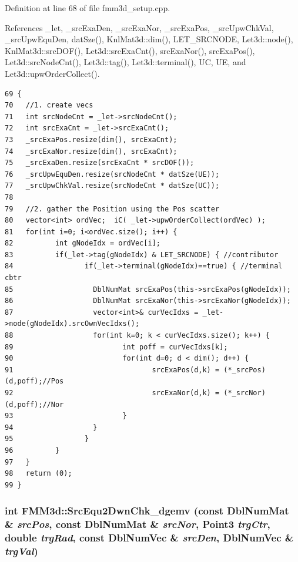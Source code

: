 Definition at line 68 of file fmm3d\_\-setup.cpp.

References \_\-let, \_\-src\-Exa\-Den, \_\-src\-Exa\-Nor, \_\-src\-Exa\-Pos, \_\-src\-Upw\-Chk\-Val, \_\-src\-Upw\-Equ\-Den, dat\-Sze(), Knl\-Mat3d::dim(), LET\_\-SRCNODE, Let3d::node(), Knl\-Mat3d::src\-DOF(), Let3d::src\-Exa\-Cnt(), src\-Exa\-Nor(), src\-Exa\-Pos(), Let3d::src\-Node\-Cnt(), Let3d::tag(), Let3d::terminal(), UC, UE, and Let3d::upw\-Order\-Collect().

\footnotesize\begin{verbatim}69 {
70   //1. create vecs
71   int srcNodeCnt = _let->srcNodeCnt();
72   int srcExaCnt = _let->srcExaCnt();
73   _srcExaPos.resize(dim(), srcExaCnt);
74   _srcExaNor.resize(dim(), srcExaCnt);
75   _srcExaDen.resize(srcExaCnt * srcDOF());
76   _srcUpwEquDen.resize(srcNodeCnt * datSze(UE));
77   _srcUpwChkVal.resize(srcNodeCnt * datSze(UC));
78   
79   //2. gather the Position using the Pos scatter
80   vector<int> ordVec;  iC( _let->upwOrderCollect(ordVec) );
81   for(int i=0; i<ordVec.size(); i++) {
82          int gNodeIdx = ordVec[i];
83          if(_let->tag(gNodeIdx) & LET_SRCNODE) { //contributor
84                 if(_let->terminal(gNodeIdx)==true) { //terminal cbtr
85                   DblNumMat srcExaPos(this->srcExaPos(gNodeIdx));
86                   DblNumMat srcExaNor(this->srcExaNor(gNodeIdx));
87                   vector<int>& curVecIdxs = _let->node(gNodeIdx).srcOwnVecIdxs();
88                   for(int k=0; k < curVecIdxs.size(); k++) {
89                          int poff = curVecIdxs[k];
90                          for(int d=0; d < dim(); d++) {
91                                 srcExaPos(d,k) = (*_srcPos)(d,poff);//Pos
92                                 srcExaNor(d,k) = (*_srcNor)(d,poff);//Nor
93                          }
94                   }
95                 }
96          }
97   }
98   return (0);
99 }
\end{verbatim}\normalsize 


\subsubsection{\setlength{\rightskip}{0pt plus 5cm}int FMM3d::Src\-Equ2Dwn\-Chk\_\-dgemv (const Dbl\-Num\-Mat \& {\em src\-Pos}, const Dbl\-Num\-Mat \& {\em src\-Nor}, Point3 {\em trg\-Ctr}, double {\em trg\-Rad}, const Dbl\-Num\-Vec \& {\em src\-Den}, Dbl\-Num\-Vec \& {\em trg\-Val})\hspace{0.3cm}{\tt  [protected]}}\label{classFMM3d_c117548aee951d6071e68dd24dfb8d26_c117548aee951d6071e68dd24dfb8d26}


